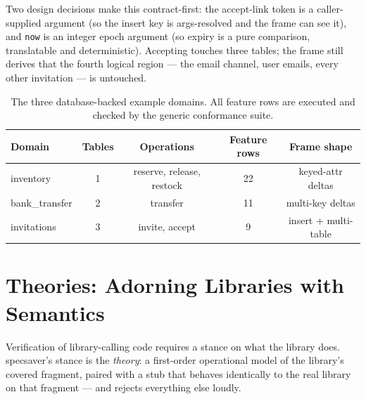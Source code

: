 \documentclass[11pt,a4paper]{article}
\begin{document}
Two design decisions make this contract-first: the accept-link token
is a caller-supplied argument (so the insert key is args-resolved and
the frame can see it), and \texttt{now} is an integer epoch argument
(so expiry is a pure comparison, translatable and deterministic).
Accepting touches three tables; the frame still derives that the
fourth logical region --- the email channel, user emails, every other
invitation --- is untouched.

\begin{table}[t]
\centering
\small
\begin{tabular}{@{}lcccc@{}}
\toprule
Domain & Tables & Operations & Feature rows & Frame shape \\
\midrule
inventory & 1 & reserve, release, restock & 22 & keyed-attr deltas \\
bank\_transfer & 2 & transfer & 11 & multi-key deltas \\
invitations & 3 & invite, accept & 9 & insert + multi-table \\
\bottomrule
\end{tabular}
\caption{The three database-backed example domains.  All feature rows
are executed and checked by the generic conformance suite.}
\label{tab:domains}
\end{table}

\section{Theories: Adorning Libraries with Semantics}\label{sec:theories}

Verification of library-calling code requires a stance on what the
library does.  \textsf{specsaver}'s stance is the \emph{theory}: a
first-order operational model of the library's covered fragment,
paired with a stub that behaves identically to the real library on
that fragment --- and rejects everything else loudly.
\end{document}
